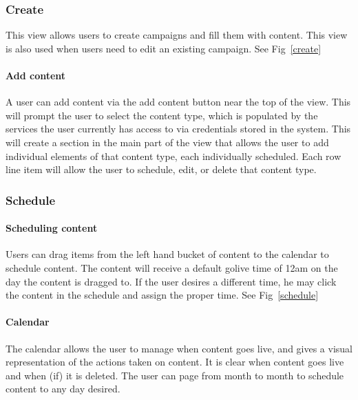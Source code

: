 \documentclass{article}
\begin{document}
\subsubsection{Create}
This view allows users to create campaigns and fill them with content.
This view is also used when users need to edit an existing
campaign. See Fig~\ref{create}
\paragraph{Add content}
A user can add content via the add content button near the top of the
view.  This will prompt the user to select the content type, which is
populated by the services the user currently has access to via
credentials stored in the system. This will create a section in the
main part of the view that allows the user to add individual elements
of that content type, each individually scheduled.  Each row line item
will allow the user to schedule, edit, or delete that content type.
\subsubsection{Schedule}
\paragraph{Scheduling content}
Users can drag items from the left hand bucket of content to the
calendar to schedule content.  The content will receive a default
golive time of 12am on the day the content is dragged to.  If the user
desires a different time, he may click the content in the schedule and
assign the proper time. See Fig~\ref{schedule}
\paragraph{Calendar}
The calendar allows the user to manage when content goes live, and
gives a visual representation of the actions taken on content.  It is
clear when content goes live and when (if) it is deleted.  The user
can page from month to month to schedule content to any day desired.
\end{document}
